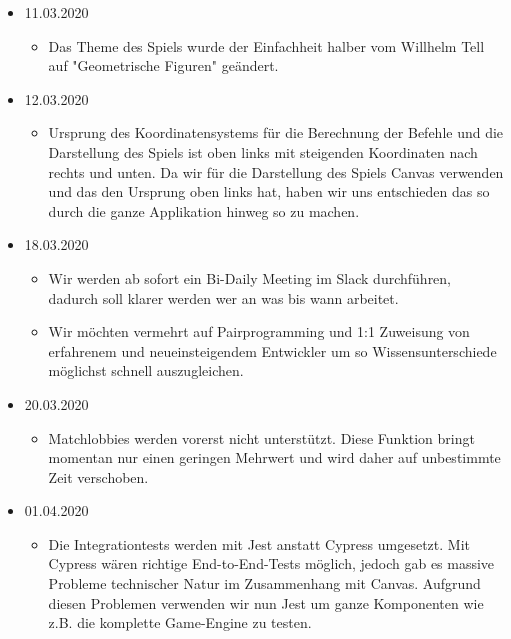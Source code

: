 \documentclass[11pt,a4paper,german]{scrartcl}
\begin{document}
\begin{itemize}
\begin{itemize}
        \end{itemize}
  \item 11.03.2020
        \begin{itemize}
          \item Das Theme des Spiels wurde der Einfachheit halber vom Willhelm Tell auf "Geometrische Figuren" geändert.
        \end{itemize}
  \item 12.03.2020
        \begin{itemize}
          \item Ursprung des Koordinatensystems für die Berechnung der Befehle und die Darstellung des Spiels ist oben links
                mit steigenden Koordinaten nach rechts und unten. Da wir für die Darstellung des Spiels Canvas verwenden und das den
                Ursprung oben links hat, haben wir uns entschieden das so durch die ganze Applikation hinweg so zu machen.
        \end{itemize}
  \item 18.03.2020
        \begin{itemize}
          \item Wir werden ab sofort ein Bi-Daily Meeting im Slack durchführen, dadurch soll klarer werden wer an was bis wann arbeitet.
          \item Wir möchten vermehrt auf Pairprogramming und 1:1 Zuweisung von erfahrenem und neueinsteigendem Entwickler um so
                Wissensunterschiede möglichst schnell auszugleichen.
        \end{itemize}
  \item 20.03.2020
        \begin{itemize}
          \item Matchlobbies werden vorerst nicht unterstützt. Diese Funktion bringt momentan nur einen geringen Mehrwert und wird daher auf unbestimmte
                Zeit verschoben.
        \end{itemize}
  \item 01.04.2020
        \begin{itemize}
          \item Die Integrationtests werden mit Jest anstatt Cypress umgesetzt. Mit Cypress wären richtige End-to-End-Tests möglich, jedoch gab es massive Probleme technischer Natur im Zusammenhang mit Canvas. 
                Aufgrund diesen Problemen verwenden wir nun Jest um ganze Komponenten wie z.B. die komplette Game-Engine zu testen.
        \end{itemize}
\end{itemize}

\clearpage
\end{document}
